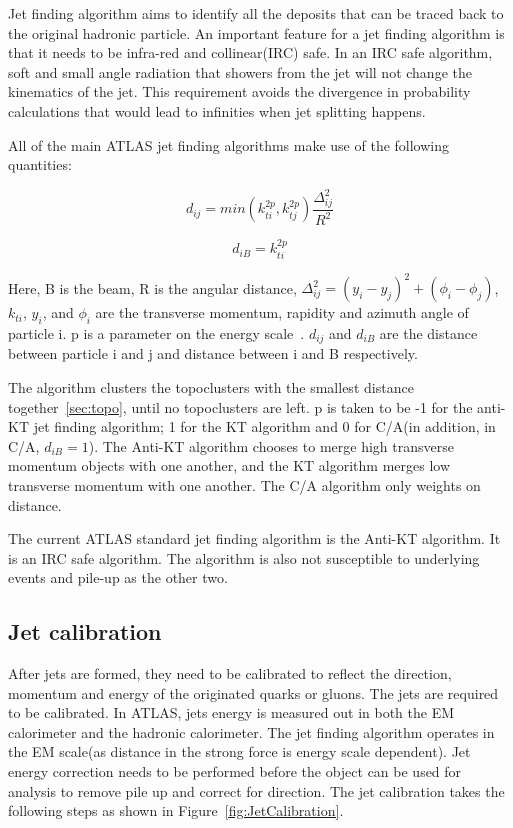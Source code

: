 Jet finding algorithm aims to identify all the deposits that can be traced back to the original hadronic particle. An important feature for a jet finding algorithm is that it needs to be infra-red and collinear(IRC) safe. In an IRC safe algorithm, soft and small angle radiation that showers from the jet will not change the kinematics of the jet. This requirement avoids the divergence in probability calculations that would lead to infinities when jet splitting happens.

All of the main ATLAS jet finding algorithms make use of the following quantities:

\begin{equation}
    d_{ij} = min(k_{ti}^{2p}, k_{tj}^{2p}) \frac{\Delta_{ij}^{2}}{R^{2}}
    \label{sec:topo}
\end{equation}

\begin{equation}
    d_{iB} = k^{2p}_{ti}
\end{equation}

Here, B is the beam, R is the angular distance, $\Delta_{ij}^{2} = (y_{i}- y_{j})^2 + (\phi_{i} - \phi_{j})$, $k_{ti}
$, $y_{i}$, and $\phi_{i}$ are the transverse momentum, rapidity and azimuth angle of particle i. p is a parameter on the energy scale~\cite{HEP2008}. $d_{ij}$ and $d_{iB}$ are the distance between particle i and j and distance between i and B respectively. 

The algorithm clusters the topoclusters with the smallest distance together~\ref{sec:topo}, until no topoclusters are left. p is taken to be -1 for the anti-KT jet finding algorithm; 1 for the KT algorithm and 0 for C/A(in addition, in C/A, $d_{iB} =1$). The Anti-KT algorithm chooses to merge high transverse momentum objects with one another, and the KT algorithm merges low transverse momentum with one another. The C/A algorithm only weights on distance.

The current ATLAS standard jet finding algorithm is the Anti-KT algorithm. It is  an IRC safe algorithm. The algorithm is also not susceptible to underlying events and pile-up as the other two. 

\subsection{Jet calibration} 

After jets are formed, they need to be calibrated to reflect the direction, momentum and energy of the originated quarks or gluons. The jets are required to be calibrated. In ATLAS, jets energy is measured out in both the EM calorimeter and the hadronic calorimeter. The jet finding algorithm operates in the EM scale(as distance in the strong force is energy scale dependent). Jet energy correction needs to be performed before the object can be used for analysis to remove pile up and correct for direction. The jet calibration takes the following steps as shown in Figure~\ref{fig:JetCalibration}.


